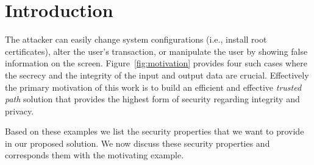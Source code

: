 \section{Introduction}
\label{sec:intro}


 The attacker can easily change system configurations (i.e., install root certificates), alter the user's transaction, or manipulate the user by showing false information on the screen. Figure~\ref{fig:motivation} provides four such cases where the secrecy and the integrity of the input and output data are crucial. Effectively the primary motivation of this work is to build an efficient and effective \emph{trusted path} solution that provides the highest form of security regarding integrity and privacy. 

Based on these examples we list the security properties that we want to provide in our proposed solution. We now discuss these security properties and corresponds them with the motivating example.

